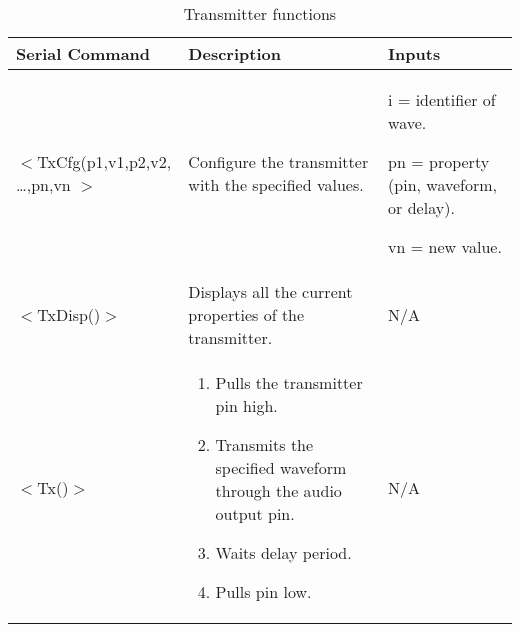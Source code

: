 \begin{table} [!htb]
	\caption{Transmitter functions}
	\label{tab:L_transmitterInteractions}
	\centering
	\begin{tabular}{ |m{}|m{}|m{}| } 
		\hline
		Serial Command & Description & Inputs \\ 
		\hline
		\hline
		\centering $<$TxCfg(p1,v1,p2,v2,
		…,pn,vn $>$ & Configure the transmitter with the specified values. & i = identifier of wave.
		
		pn = property (pin, waveform, or delay).
		
		vn = new value. \\
		\hline
		\centering $<$TxDisp()$>$ & Displays all the current properties of the transmitter. & N/A \\
		\hline
		\centering $<$Tx()$>$ & \begin{enumerate}
			\item Pulls the transmitter pin high.
			\item Transmits the specified waveform through the audio output pin.
			\item Waits delay period.
			\item Pulls pin low.
		\end{enumerate} & N/A \\
		\hline
	\end{tabular}
\end{table}